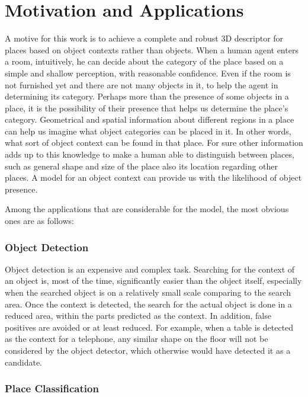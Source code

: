 \section{Motivation and Applications}
\label{MotivationandApplications.sec}
A motive for this work is to achieve a complete and robust 3D descriptor for places based on object contexts 
rather than objects. 
When a human agent enters a room, intuitively, he can decide about the category of the place based on a simple and 
shallow perception, with reasonable confidence. 
Even if the room is not furnished yet and there are not many objects in it, to help the agent in determining its 
category. 
Perhaps more than the presence of some objects in a place, it is the possibility of their presence that helps us 
determine the place's category. Geometrical and spatial information about different regions in a place can help us imagine what object categories can be placed in it. In other words, what sort of object context can be found in that place. 
For sure other information adds up to this knowledge to make a human able to distinguish between places, such as general 
shape and size of the place also its location regarding other places. 
A model for an object context can provide us with the likelihood of object presence.

Among the applications that are considerable for the model, the most obvious ones are as follows:


\subsubsection*{Object Detection}

Object detection is an expensive and complex task. Searching for the context of 
an object is, most of the time, significantly easier than the object itself, especially when the searched object is on a relatively small scale comparing to the search area. 
Once the context is detected, the search for the actual object is done in a reduced area, within the parts predicted as the context.  
In addition, false positives are avoided or at least reduced. For example, when a table is detected as the context for a telephone, any similar shape  on the floor will not be considered by the object detector, which otherwise would have detected it as a candidate. 

\subsubsection*{Place Classification}
 
